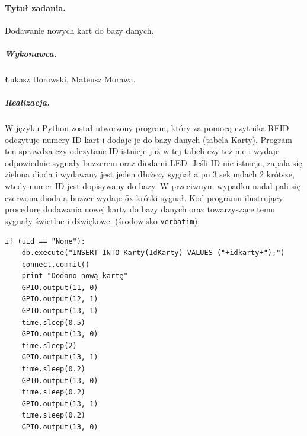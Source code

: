 \documentclass[a4paper]{article}
\begin{document}
\paragraph{Tytuł zadania.} Dodawanie nowych kart do bazy danych.
\subparagraph{Wykonawca.} Łukasz Horowski, Mateusz Morawa.
\subparagraph{Realizacja.} W języku Python został utworzony program, który za pomocą czytnika RFID odczytuje numery ID kart i dodaje je do bazy danych (tabela Karty). Program ten sprawdza czy odczytane ID istnieje już w tej tabeli czy też nie i wydaje odpowiednie sygnały buzzerem oraz diodami LED. Jeśli ID nie istnieje, zapala się zielona dioda i wydawany jest jeden dłuższy sygnał a po 3 sekundach 2 krótsze, wtedy numer ID jest dopisywany do bazy. W przeciwnym wypadku nadal pali się czerwona dioda a buzzer wydaje 5x krótki sygnał.
Kod programu ilustrujący procedurę dodawania nowej karty do bazy danych oraz towarzyszące temu sygnały świetlne i dźwiękowe. (środowisko \texttt{verbatim}): 
\begin{verbatim}
if (uid == "None"):
    db.execute("INSERT INTO Karty(IdKarty) VALUES ("+idkarty+");")
    connect.commit()
    print "Dodano nową kartę"
    GPIO.output(11, 0)
    GPIO.output(12, 1)
    GPIO.output(13, 1)
    time.sleep(0.5)
    GPIO.output(13, 0)
    time.sleep(2)
    GPIO.output(13, 1)
    time.sleep(0.2)
    GPIO.output(13, 0)
    time.sleep(0.2)
    GPIO.output(13, 1)
    time.sleep(0.2)
    GPIO.output(13, 0)
\end{verbatim}
\end{document}

